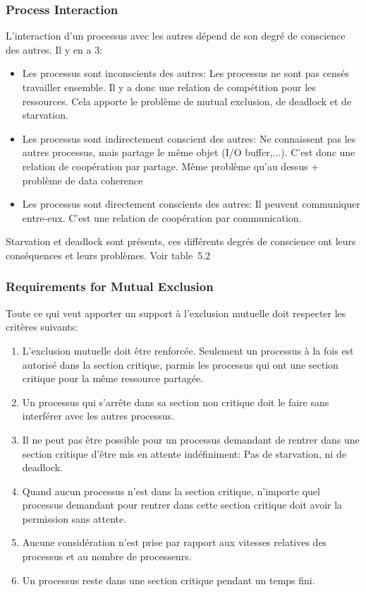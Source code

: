 \subsubsection{Process Interaction}
L'interaction d'un processus avec les autres dépend de son degré de conscience des autres.
Il y en a 3:
\begin{itemize}
  \item Les processus sont inconscients des autres:
    Les processus ne sont pas censés travailler ensemble.
    Il y a donc une relation de compétition pour les ressources.
    Cela apporte le problème de mutual exclusion, de deadlock et de starvation.
  \item Les processus sont indirectement conscient des autres:
    Ne connaissent pas les autres processus,
    mais partage le même objet (I/O buffer,...).
    C'est donc une relation de coopération par partage.
    Même problème qu'au dessus + problème de data coherence
  \item Les processus sont directement conscients des autres:
    Il peuvent communiquer entre-eux.
    C'est une relation de coopération par communication.
\end{itemize}

Starvation et deadlock sont présents,
ces différents degrés de conscience ont leurs conséquences et leurs problèmes.
Voir table~5.2 \cite[p.~225]{stallings}

\subsubsection{Requirements for Mutual Exclusion}
Toute ce qui veut apporter un support à l'exclusion mutuelle doit respecter les critères suivants:
\begin{enumerate}
  \item L'exclusion mutuelle doit être renforcée.
    Seulement un processus à la fois est autorisé dans la section critique,
    parmis les processus qui ont une section critique pour la même ressource partagée.
  \item Un processus qui s'arrête dans sa section non critique doit le faire sans interférer avec les autres processus.
  \item Il ne peut pas être possible pour un processus demandant de rentrer dans une section critique d'être mis en attente indéfiniment:
    Pas de starvation, ni de deadlock.
  \item Quand aucun processus n'est dans la section critique,
    n'importe quel processus demandant pour rentrer dans cette section critique doit avoir la permission sans attente.
  \item Aucune considération n'est prise par rapport aux vitesses relatives des processus et au nombre de processeurs.
  \item Un processus reste dans une section critique pendant un temps fini.
\end{enumerate}

